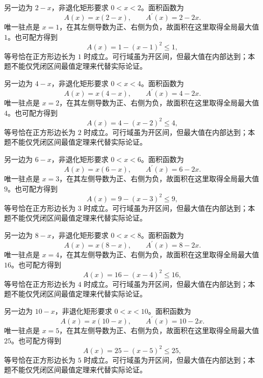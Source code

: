 \documentclass[12pt,fontset=fandol]{ctexart}
\begin{document}
\begin{solve}\label{ans:c11q8}
另一边为 $2-x$，非退化矩形要求 $0<x<2$。面积函数为
\[
A(x)=x(2-x),\qquad A^{\prime}(x)=2-2x.
\]
唯一驻点是 $x=1$，在其左侧导数为正、右侧为负，故面积在这里取得全局最大值 $1$。也可配方得到
\[
A(x)=1-(x-1)^2\le 1,
\]
等号恰在正方形边长为 $1$ 时成立。可行域虽为开区间，但最大值在内部达到；本题不能仅凭闭区间最值定理来代替实际论证。
\end{solve}

\begin{solve}\label{ans:c11q9}
另一边为 $4-x$，非退化矩形要求 $0<x<4$。面积函数为
\[
A(x)=x(4-x),\qquad A^{\prime}(x)=4-2x.
\]
唯一驻点是 $x=2$，在其左侧导数为正、右侧为负，故面积在这里取得全局最大值 $4$。也可配方得到
\[
A(x)=4-(x-2)^2\le 4,
\]
等号恰在正方形边长为 $2$ 时成立。可行域虽为开区间，但最大值在内部达到；本题不能仅凭闭区间最值定理来代替实际论证。
\end{solve}

\begin{solve}\label{ans:c11q10}
另一边为 $6-x$，非退化矩形要求 $0<x<6$。面积函数为
\[
A(x)=x(6-x),\qquad A^{\prime}(x)=6-2x.
\]
唯一驻点是 $x=3$，在其左侧导数为正、右侧为负，故面积在这里取得全局最大值 $9$。也可配方得到
\[
A(x)=9-(x-3)^2\le 9,
\]
等号恰在正方形边长为 $3$ 时成立。可行域虽为开区间，但最大值在内部达到；本题不能仅凭闭区间最值定理来代替实际论证。
\end{solve}

\begin{solve}\label{ans:c11q11}
另一边为 $8-x$，非退化矩形要求 $0<x<8$。面积函数为
\[
A(x)=x(8-x),\qquad A^{\prime}(x)=8-2x.
\]
唯一驻点是 $x=4$，在其左侧导数为正、右侧为负，故面积在这里取得全局最大值 $16$。也可配方得到
\[
A(x)=16-(x-4)^2\le 16,
\]
等号恰在正方形边长为 $4$ 时成立。可行域虽为开区间，但最大值在内部达到；本题不能仅凭闭区间最值定理来代替实际论证。
\end{solve}

\begin{solve}\label{ans:c11q12}
另一边为 $10-x$，非退化矩形要求 $0<x<10$。面积函数为
\[
A(x)=x(10-x),\qquad A^{\prime}(x)=10-2x.
\]
唯一驻点是 $x=5$，在其左侧导数为正、右侧为负，故面积在这里取得全局最大值 $25$。也可配方得到
\[
A(x)=25-(x-5)^2\le 25,
\]
等号恰在正方形边长为 $5$ 时成立。可行域虽为开区间，但最大值在内部达到；本题不能仅凭闭区间最值定理来代替实际论证。
\end{solve}
\end{document}

